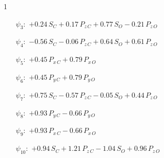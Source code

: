 \begin{questionBox}1{}
    \begin{itemize}
        \item[\(\psi_3:\)]
            \(
            +   0.24\,S_C
            +   0.17\,P_{z\,C}
            +   0.77\,S_O
            -   0.21\,P_{z\,O}
            \)
        \item[\(\psi_4:\)]
            \(
            -   0.56\,S_C
            -   0.06\,P_{z\,C}
            +   0.64\,S_O
            +   0.61\,P_{z\,O}
            \)
        \item[\(\psi_5:\)]
            \(
            +   0.45\,P_{x\,C}
            +   0.79\,P_{x\,O}
            \)
        \item[\(\psi_6:\)]
            \(
            +   0.45\,P_{y\,C}
            +   0.79\,P_{y\,O}
            \)
        \item[\(\psi_7:\)]
            \(
            +   0.75\,S_C
            -   0.57\,P_{z\,C}
            -   0.05\,S_O
            +   0.44\,P_{z\,O}
            \)
        \item[\(\psi_8:\)]
            \(
            +   0.93\,P_{y\,C}
            -   0.66\,P_{y\,O}
            \)
        \item[\(\psi_9:\)]
            \(
            +   0.93\,P_{x\,C}
            -   0.66\,P_{x\,O}
            \)
        \item[\(\psi_{10}:\)]
            \(
            +   0.94\,S_C
            +   1.21\,P_{z\,C}
            -   1.04\,S_O
            +   0.96\,P_{z\,O}
            \)
    \end{itemize}



    \begin{center}
        \begin{modiagram}
            \setlength\AtomVScale{0.2cm}



\end{modiagram}
\end{center}
\end{questionBox}
